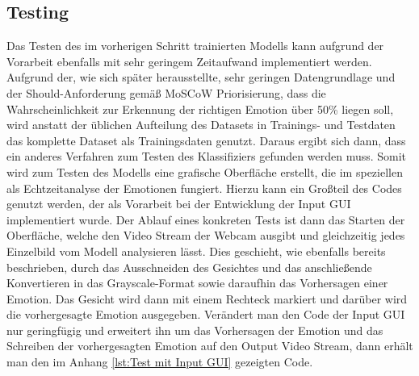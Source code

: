 \documentclass[12pt, a4paper]{report}
\begin{document}
\subsection{Testing}
Das Testen des im vorherigen Schritt trainierten Modells kann aufgrund der Vorarbeit ebenfalls mit sehr geringem Zeitaufwand implementiert werden. Aufgrund der, wie sich später herausstellte, sehr geringen Datengrundlage und der Should-Anforderung gemäß MoSCoW Priorisierung, dass die Wahrscheinlichkeit zur Erkennung der richtigen Emotion über 50\% liegen soll, wird anstatt der üblichen Aufteilung des Datasets in Trainings- und Testdaten das komplette Dataset als Trainingsdaten genutzt. Daraus ergibt sich dann, dass ein anderes Verfahren zum Testen des Klassifiziers gefunden werden muss. Somit wird zum Testen des Modells eine grafische Oberfläche erstellt, die im speziellen als Echtzeitanalyse der Emotionen fungiert. Hierzu kann ein Großteil des Codes genutzt werden, der als Vorarbeit bei der Entwicklung der Input GUI implementiert wurde. Der Ablauf eines konkreten Tests ist dann das Starten der Oberfläche, welche den Video Stream der Webcam ausgibt und gleichzeitig jedes Einzelbild vom Modell analysieren lässt. Dies geschieht, wie ebenfalls bereits beschrieben, durch das Ausschneiden des Gesichtes und das anschließende Konvertieren in das Grayscale-Format sowie daraufhin das Vorhersagen einer Emotion. Das Gesicht wird dann mit einem Rechteck markiert und darüber wird die vorhergesagte Emotion ausgegeben. Verändert man den Code der Input GUI nur geringfügig und erweitert ihn um das Vorhersagen der Emotion und das Schreiben der vorhergesagten Emotion auf den Output Video Stream, dann erhält man den im Anhang \ref{lst:Test mit Input GUI} gezeigten Code.
\end{document}
